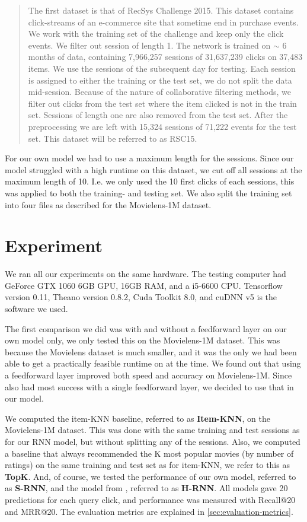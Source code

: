 \begin{quotation}
	The first dataset is that of RecSys Challenge 2015. This dataset contains click-streams of an e-commerce site that sometime end in purchase events. We work with the training set of the challenge and keep only the click events. We filter out session of length 1. The network is trained on $\sim$ 6 months of data, containing 7,966,257 sessions of 31,637,239 clicks on 37,483 items. We use the sessions of the subsequent day for testing. Each session is assigned to either the training or the test set, we do not split the data mid-session. Because of the nature of collaborative filtering methods, we filter out clicks from the test set where the item clicked is not in the train set. Sessions of length one are also removed from the test set. After the preprocessing we are left with 15,324 sessions of 71,222 events for the test set. This dataset will be referred to as RSC15.
\end{quotation}

For our own model we had to use a maximum length for the sessions. Since our model struggled with a high runtime on this dataset, we cut off all sessions at the maximum length of 10. I.e. we only used the 10 first clicks of each sessions, this was applied to both the training- and testing set. We also split the training set into four files as described for the Movielens-1M dataset. 

\section{Experiment}
We ran all our experiments on the same hardware. The testing computer had GeForce GTX 1060 6GB GPU, 16GB RAM, and a i5-6600 CPU. Tensorflow version 0.11, Theano version 0.8.2, Cuda Toolkit 8.0, and cuDNN v5 is the software we used. 

The first comparison we did was with and without a feedforward layer on our own model only, we only tested this on the Movielens-1M dataset. This was because the Movielens dataset is much smaller, and it was the only we had been able to get a practically feasible runtime on at the time. We found out that using a feedforward layer improved both speed and accuracy on Movielens-1M. Since \cite{DBLP:journals/corr/HidasiKBT15} also had most success with a single feedforward layer, we decided to use that in our model. 

We computed the item-KNN baseline, referred to as \textbf{Item-KNN}, on the Movielens-1M dataset. This was done with the same training and test sessions as for our RNN model, but without splitting any of the sessions. Also, we computed a baseline that always recommended the K most popular movies (by number of ratings) on the same training and test set as for item-KNN, we refer to this as \textbf{TopK}. And, of course, we tested the performance of our own model, referred to as \textbf{S-RNN}, and the model from \cite{DBLP:journals/corr/HidasiKBT15}, referred to as \textbf{H-RNN}. All models gave 20 predictions for each query click, and performance was measured with Recall@20 and MRR@20. The evaluation metrics are explained in \ref{sec:evaluation-metrics}.

